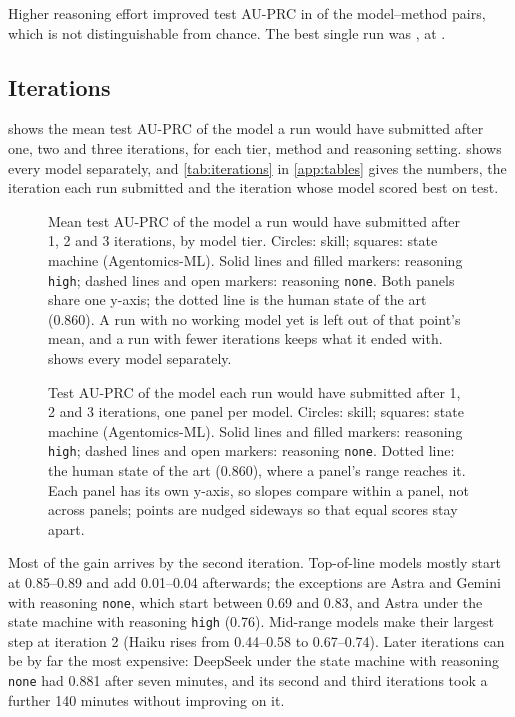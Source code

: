 Higher reasoning effort improved test AU-PRC in \HighWins{} of the \HighPairs{} model--method pairs, which is not distinguishable
from chance. The best single run was \BestCell, at \BestScore.

\subsection{Iterations}\label{sec:iterations}

 shows the mean test AU-PRC of the model a run would have submitted after one, two and three
iterations, for each tier, method and reasoning setting.  shows every model separately, and \cref{tab:iterations} in \cref{app:tables} gives the
numbers, the iteration each run submitted and the iteration whose model scored best on test.

\begin{figure}[tbp]\centering

\caption{Mean test AU-PRC of the model a run would have submitted after 1, 2 and 3 iterations, by model tier. Circles:
skill; squares: state machine (Agentomics-ML). Solid lines and filled markers: reasoning \texttt{high}; dashed lines
and open markers: reasoning \texttt{none}. Both panels share one y-axis; the dotted line is the human state of the art (0.860). A run with no working model yet is left out
of that point's mean, and a run with fewer iterations keeps what it ended with.  shows every model separately.}
\label{fig:itermeans}
\end{figure}

\begin{figure}[tbp]\centering

\caption{Test AU-PRC of the model each run would have submitted after 1, 2 and 3 iterations, one panel per model.
Circles: skill; squares: state machine (Agentomics-ML). Solid lines and filled markers: reasoning \texttt{high};
dashed lines and open markers: reasoning \texttt{none}. Dotted line: the human state of the art (0.860), where a
panel's range reaches it. Each panel has its own y-axis, so slopes compare within a panel, not across panels;
points are nudged sideways so that equal scores stay apart.}
\label{fig:iterations}
\end{figure}

Most of the gain arrives by the second iteration. Top-of-line models mostly start at 0.85--0.89 and add 0.01--0.04 afterwards; the exceptions are Astra and Gemini with
reasoning \texttt{none}, which start between 0.69 and 0.83, and Astra under the state machine with reasoning \texttt{high} (0.76). Mid-range models make their largest step at iteration 2
(Haiku rises from 0.44--0.58 to 0.67--0.74). Later iterations
can be by far the most expensive: DeepSeek under the state machine with reasoning \texttt{none} had 0.881 after seven
minutes, and its second and third iterations took a further 140 minutes without improving on it.

